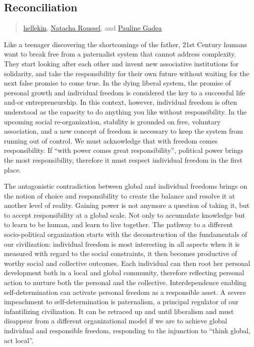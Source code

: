 \subsection{Reconciliation}\label{reconciliation}

\begin{quote}
\href{../appendix/attributions.html\#hellekin}{hellekin},
\href{../appendix/attributions.html\#natacha-roussel}{Natacha Roussel},
and \href{../appendix/attributions.html\#pauline-gadea}{Pauline Gadea}
\end{quote}

Like a teenager discovering the shortcomings of the father, 21st Century
humans want to break free from a paternalist system that cannot address
complexity. They start looking after each other and invent new
associative institutions for solidarity, and take the responsibility for
their own future without waiting for the next false promise to come
true. In the dying liberal system, the promise of personal growth and
individual freedom is considered the key to a successful life and-or
entrepreneurship. In this context, however, individual freedom is often
understood as the capacity to do anything you like without
responsibility. In the upcoming social re-organization, stability is
grounded on free, voluntary association, and a new concept of freedom is
necessary to keep the system from running out of control. We must
acknowledge that with freedom comes responsibility. If ``with power
comes great responsibility'', political power brings the most
responsibility, therefore it must respect individual freedom in the
first place.

The antagonistic contradiction between global and individual freedoms
brings on the notion of choice and responsibility to create the balance
and resolve it at another level of reality. Gaining power is not anymore
a question of taking it, but to accept responsibility at a global scale.
Not only to accumulate knowledge but to learn to be human, and learn to
live together. The pathway to a different socio-political organization
starts with the deconstruction of the fundamentals of our civilization:
individual freedom is most interesting in all aspects when it is
measured with regard to the social constraints, it then becomes
productive of worthy social and collective outcomes. Each individual can
then root her personal development both in a local and global community,
therefore reflecting personal action to nurture both the personal and
the collective. Interdependence enabling self-determination can activate
personal freedom as a responsible asset. A severe impeachment to
self-determination is paternalism, a principal regulator of our
infantilizing civilization. It can be retraced up and until liberalism
and must disappear from a different organizational model if we are to
achieve global individual and responsible freedom, responding to the
injunction to ``think global, act local''.

